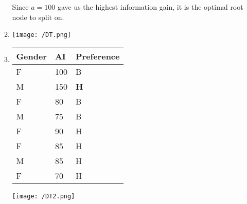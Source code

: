 \documentclass[12pt]{article}
\begin{document}
\begin{enumerate}
\begin{enumerate}
\begin{enumerate}
            \end{enumerate}
            Since $a = 100$ gave us the highest information gain, it is the optimal root node to split on.
            
            \item \texttt{[image: /DT.png]}
            
            \item 
            \begin{table}[]
            \begin{tabular}{|l|l|l|}
            \hline
            Gender & AI  & Preference                        \\ \hline
            F      & 100 & B                                 \\ \hline
            M      & 150 & {\color[HTML]{FE0000} \textbf{H}} \\ \hline
            F      & 80  & B                                 \\ \hline
            M      & 75  & B                                 \\ \hline
            F      & 90  & H                                 \\ \hline
            F      & 85  & H                                 \\ \hline
            M      & 85  & H                                 \\ \hline
            F      & 70  & H                                 \\ \hline
            \end{tabular}
            \end{table}
            \texttt{[image: /DT2.png]}
            
        \end{enumerate}
\end{enumerate}
    
\end{document}
